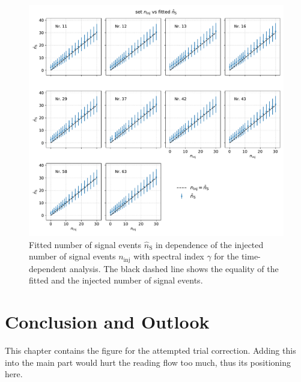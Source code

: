\begin{figure}
    \centering
    \includegraphics[width=\linewidth]{Plots/appendix/ns_fit_time_dep.pdf}
    \caption{Fitted number of signal events $\hat{n}_{\text{S}}$ in dependence of the injected number of signal events $n_\text{inj}$ with spectral index $\gamma$ for the time-dependent analysis. The black dashed line shows the equality of the fitted and the injected number of signal events.}
    \label{fig:ns_fit_time_dep}
\end{figure}

\section{Conclusion and Outlook}

This chapter contains the figure for the attempted trial correction.
Adding this into the main part would hurt the reading flow too much, thus its positioning here.

